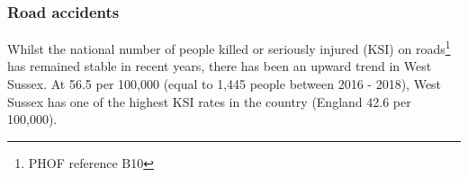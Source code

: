 
\subsubsection{Road accidents} Whilst the national number of people killed or seriously injured (KSI) on roads\footnote{PHOF reference B10} has remained stable in recent years, there has been an upward trend in West Sussex. At 56.5 per 100,000 (equal to 1,445 people between 2016 - 2018), West Sussex has one of the highest KSI rates in the country (England 42.6 per 100,000).


